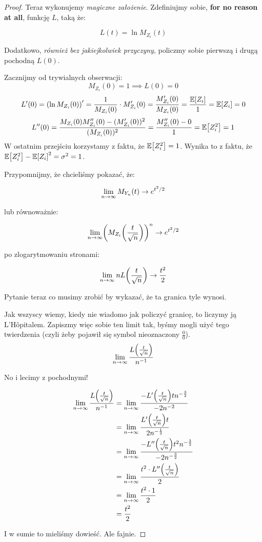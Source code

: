 \begin{proof}
    Teraz wykonujemy \textit{magiczne założenie}. Zdefiniujmy sobie, \textbf{for no reason at all}, funkcję \(L\), taką że:
    
    \[
        L(t) = \ln M_{Z_i}(t)
    \]
    
    Dodatkowo, \textit{również bez jakiejkolwiek przyczyny}, policzmy sobie pierwszą i drugą pochodną \(L(0)\). 
    
    Zacznijmy od trywialnych obserwacji:
    \[
    M_{Z_i}(0) = 1 \implies L(0) = 0
    \]
    \[
    L'(0) = \pars{\ln M_{Z_i}(0)}' = \frac{1}{M_{Z_i}(0)} \cdot M'_{Z_i}(0) = \frac{M_{Z_i}'(0)}{M_{Z_i}(0)} = \frac{\expected{Z_i}}{1} = \expected{Z_i} = 0
    \]
    \[
    L''(0) = \frac{M_{Z_i}(0)M_{Z_i}''(0) - (M_{Z_i}'(0))^2}{(M_{Z_i}(0))^2} = \frac{M_{Z_i}''(0) - 0}{1} = \expected{Z_i^2} = 1
    \]
    W ostatnim przejściu korzystamy z faktu, że \( \expected{Z_{i}^2} = 1\). Wynika to z faktu, że \( \expected{Z_{i}^2} - \expected{Z_{i}}^2 = \sigma^2 = 1\).
    
    Przypomnijmy, że chcieliśmy pokazać, że:
    
    
    \[
    \lim_{n\to\infty}M_{Y_n}\pars{t} \to e^{t^2/2}
    \]
    
    lub równoważnie:
    
    \[ 
        \lim_{n \to \infty } \pars{M_{Z_i}\pars{\frac{t}{\sqrt{n}}}}^n \to e^{t^2 / 2}
    \]
    
    po zlogarytmowaniu stronami:
    
    \[ 
        \lim_{n \to \infty} nL\pars{\frac{t}{\sqrt{n}}} \to \frac{t^2}{2}
    \]
    
    Pytanie teraz co musimy zrobić by wykazać, że ta granica tyle wynosi. 
    
    Jak wszyscy wiemy, kiedy nie wiadomo jak policzyć granicę, to liczymy ją L’Hôpitalem. Zapiszmy więc sobie ten limit tak, byśmy mogli użyć tego twierdzenia (czyli żeby pojawił się symbol nieoznaczony \( \frac{0}{0} \)).
    \[
    \lim_{n \to \infty}\frac{L\pars{\frac{t}{\sqrt{n}}}}{n^{-1}}
    \]
    
    No i lecimy z pochodnymi!
    
    \begin{align*}
        \lim_{n \to \infty}\frac{L \pars{\frac{t}{\sqrt{n}}}}{n^{-1}} &= \lim_{n \to \infty}\frac{-L'\pars{\frac{t}{\sqrt{n}}}tn^{-\frac{3}{2}}}{-2n^{-2}} \\
        &= \lim_{n \to \infty}\frac{L'\pars{\frac{t}{\sqrt{n}}}t}{2n^{-\frac{1}{2}}} \\ 
        &= \lim_{n \to \infty}\frac{-L''\pars{\frac{t}{\sqrt{n}}}t^2 n^{-\frac{3}{2}}}{-2n^{-\frac{3}{2}}} \\ 
        &= \lim_{n \to \infty} \frac{t^2 \cdot L''\pars{\frac{t}{\sqrt{n}}}}{2} \\ 
        &= \lim_{n \to \infty} \frac{t^2 \cdot 1 }{2} \\
        &= \frac{t^2}{2}
    \end{align*}
        
    I w sumie to mieliśmy dowieść. Ale fajnie. 
\end{proof}

